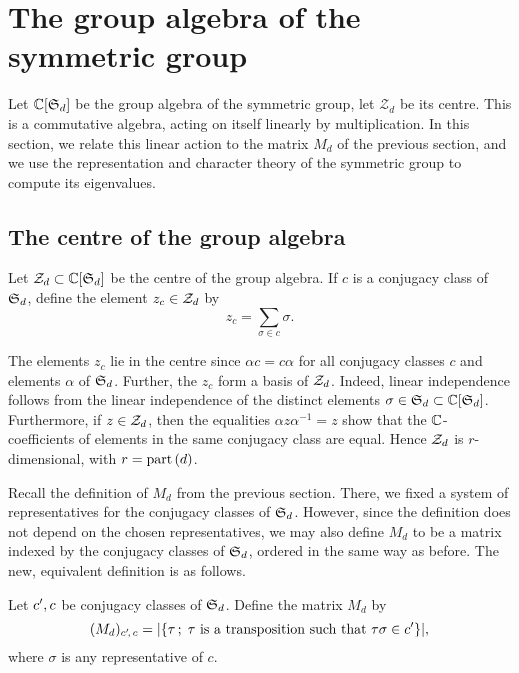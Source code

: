 \section{The group algebra of the symmetric group}

Let $\mathbb{C}[\operatorname{\mathfrak{S}}_d]$ be the group algebra of the symmetric group, let $\mathcal{Z}_d$ be its centre. This is a commutative algebra, acting on itself linearly by multiplication. In this section, we relate this linear action to the matrix $M_d$ of the previous section, and we use the representation and character theory of the symmetric group to compute its eigenvalues.

\subsection{The centre of the group algebra}

\begin{defi}
 Let $\mathcal{Z}_d\subset\mathbb{C}[\operatorname{\mathfrak{S}}_d]$ be the centre of the group algebra. If $c$ is a conjugacy class of $\operatorname{\mathfrak{S}}_d$, define the element $z_c\in\mathcal{Z}_d$ by
 \[
  z_c=\sum_{\sigma\in c}\sigma.
 \]
\end{defi}

\begin{rmk}
 The elements $z_c$ lie in the centre since $\alpha c=c\alpha$ for all conjugacy classes $c$ and elements $\alpha$ of $\operatorname{\mathfrak{S}}_d$. Further, the $z_c$ form a basis of $\mathcal{Z}_d$. Indeed, linear independence follows from the linear independence of the distinct elements $\sigma\in\operatorname{\mathfrak{S}}_d\subset\mathbb{C}[\operatorname{\mathfrak{S}}_d]$. Furthermore, if $z\in\mathcal{Z}_d$, then the equalities $\alpha z\alpha^{-1}=z$ show that the $\mathbb{C}$-coefficients of elements in the same conjugacy class are equal. Hence $\mathcal{Z}_d$ is $r$-dimensional, with $r=\operatorname{part}{(d)}$.
\end{rmk}

Recall the definition of $M_d$ from the previous section. There, we fixed a system of representatives for the conjugacy classes of $\operatorname{\mathfrak{S}}_d$. However, since the definition does  not depend on the chosen representatives, we may also define $M_d$ to be a matrix indexed by the conjugacy classes of $\operatorname{\mathfrak{S}}_d$, ordered in the same way as before. The new, equivalent definition is as follows.

\begin{defi} Let $c',c$ be conjugacy classes of $\operatorname{\mathfrak{S}}_d$. Define the matrix $M_d$ by
\[(M_d)_{c'\!,\, c} = |\{\tau\,;\; \tau\text{ is a transposition such that }\tau\sigma\in c'\}|,\] where $\sigma$ is any representative of $c$.
\end{defi}

